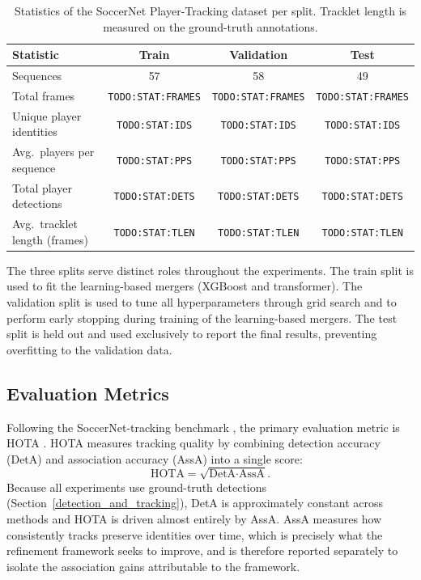 \begin{table}[H]
\centering
\begin{tabular}{lccc}
\toprule
\textbf{Statistic} & \textbf{Train} & \textbf{Validation} & \textbf{Test} \\
\midrule
Sequences                              & 57 & 58 & 49 \\
Total frames                           & \texttt{TODO:STAT:FRAMES}   & \texttt{TODO:STAT:FRAMES}   & \texttt{TODO:STAT:FRAMES}   \\
Unique player identities               & \texttt{TODO:STAT:IDS}      & \texttt{TODO:STAT:IDS}      & \texttt{TODO:STAT:IDS}      \\
Avg.\ players per sequence             & \texttt{TODO:STAT:PPS}      & \texttt{TODO:STAT:PPS}      & \texttt{TODO:STAT:PPS}      \\
Total player detections                & \texttt{TODO:STAT:DETS}     & \texttt{TODO:STAT:DETS}     & \texttt{TODO:STAT:DETS}     \\
Avg.\ tracklet length (frames)         & \texttt{TODO:STAT:TLEN}     & \texttt{TODO:STAT:TLEN}     & \texttt{TODO:STAT:TLEN}     \\
\bottomrule
\end{tabular}
\caption{Statistics of the SoccerNet Player-Tracking dataset per split. Tracklet length is measured on the ground-truth annotations.}
\label{tab:dataset_stats}
\end{table}

The three splits serve distinct roles throughout the experiments. The train split is used to fit the learning-based mergers (XGBoost and transformer). The validation split is used to tune all hyperparameters through grid search and to perform early stopping during training of the learning-based mergers. The test split is held out and used exclusively to report the final results, preventing overfitting to the validation data.

\subsection{Evaluation Metrics}\label{subsec:metrics}

Following the SoccerNet-tracking benchmark \cite{cioppa2022soccernet}, the primary evaluation metric is HOTA \cite{hota}. HOTA measures tracking quality by combining detection accuracy (DetA) and association accuracy (AssA) into a single score:
\begin{equation}
    \text{HOTA} = \sqrt{\text{DetA} \cdot \text{AssA}}.
\end{equation}
Because all experiments use ground-truth detections (Section~\ref{detection_and_tracking}), DetA is approximately constant across methods and HOTA is driven almost entirely by AssA. AssA measures how consistently tracks preserve identities over time, which is precisely what the refinement framework seeks to improve, and is therefore reported separately to isolate the association gains attributable to the framework.

